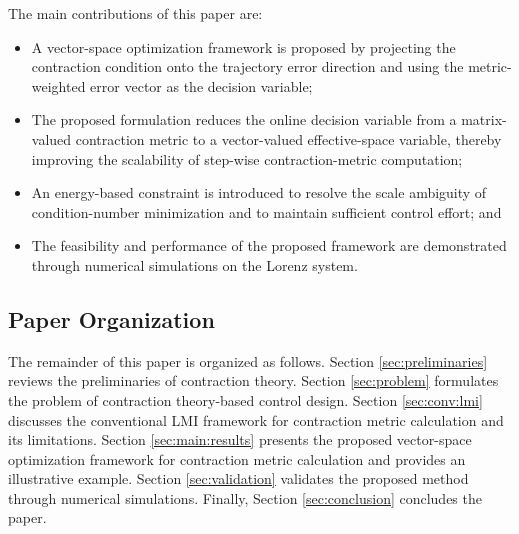\documentclass{ifacconf}
\begin{document}
The main contributions of this paper are:
\begin{itemize}
   \item A vector-space optimization framework is proposed by projecting the contraction condition onto the trajectory error direction and using the metric-weighted error vector as the decision variable;
   \item The proposed formulation reduces the online decision variable from a matrix-valued contraction metric to a vector-valued effective-space variable, thereby improving the scalability of step-wise contraction-metric computation;
   \item An energy-based constraint is introduced to resolve the scale ambiguity of condition-number minimization and to maintain sufficient control effort; and
   \item The feasibility and performance of the proposed framework are demonstrated through numerical simulations on the Lorenz system.

\end{itemize}

\subsection{Paper Organization}

The remainder of this paper is organized as follows.
Section \ref{sec:preliminaries} reviews the preliminaries of contraction theory.
Section \ref{sec:problem} formulates the problem of contraction theory-based control design.
Section \ref{sec:conv:lmi} discusses the conventional LMI framework for contraction metric calculation and its limitations.
Section \ref{sec:main:results} presents the proposed vector-space optimization framework for contraction metric calculation and provides an illustrative example.
Section \ref{sec:validation} validates the proposed method through numerical simulations.
Finally, Section \ref{sec:conclusion} concludes the paper.
\end{document}
